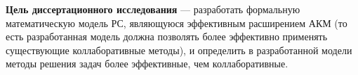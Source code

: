 

{\bf Цель диссертационного исследования} --- разработать
формальную математическую модель РС, являющуюся эффективным расширением
АКМ (то есть разработанная модель должна позволять более эффективно
применять существующие коллаборативные методы), и определить в разработанной модели
методы решения задач более эффективные, чем коллаборативные.

